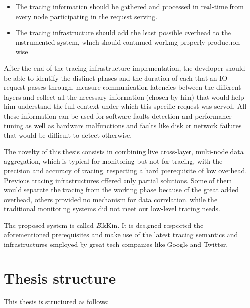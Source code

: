 \begin{itemize}
    \item The tracing information should be gathered and processed in real-time
        from every node participating in the request serving.
    \item The tracing infrastructure should add the least possible overhead to
        the instrumented system, which should continued working properly 
        production-wise
\end{itemize}

After the end of the tracing infrastructure implementation, the developer should
be able to identify the distinct phases and the duration of each that an IO
request passes through, measure communication latencies between the different
layers and collect all the necessary information (chosen by him) that would help
him understand the full context under which this specific request was served.
All these information can be used for software faults detection and performance
tuning as well as hardware malfunctions and faults like disk or network failures
that would be difficult to detect otherwise.

The novelty of this thesis consists in combining live cross-layer, multi-node
data aggregation, which is typical for monitoring but not for tracing, with the
precision and accuracy of tracing, respecting a hard prerequisite of low
overhead. Previous tracing infrastructures offered only partial solutions. Some
of them would separate the tracing from the working phase because of the great
added overhead, others provided no mechanism for data correlation, while the
traditional monitoring systems did not meet our low-level tracing needs.

The proposed system is called \textit BlkKin. It is designed respected the
aforementioned prerequisites and make use of the latest tracing semantics and
infrastructures employed by great tech companies like Google and Twitter.  

\section{Thesis structure} 
This thesis is structured as follows:
